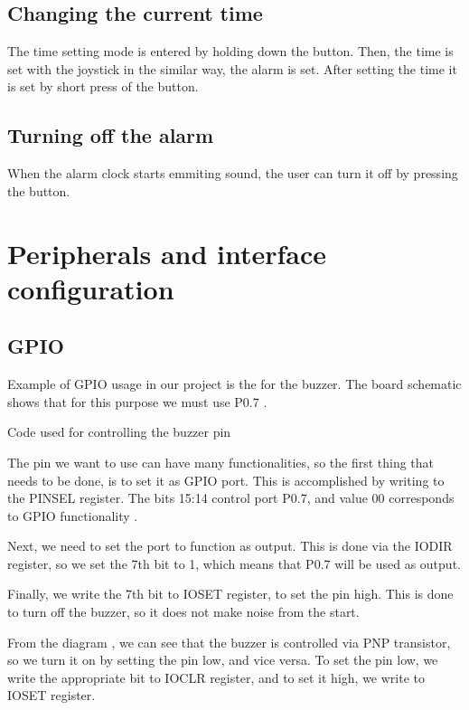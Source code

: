 \documentclass[10pt]{article}
\newcommand{\code}[3]{}
\begin{document}
    \subsection{Changing the current time}
    The time setting mode is entered by holding down the button.
    Then, the time is set with the joystick in the similar way, the alarm is set.
    After setting the time it is set by short press of the button.

    \subsection{Turning off the alarm}
    When the alarm clock starts emmiting sound, the user can turn it off by pressing the button.

    \section{Peripherals and interface configuration}
    
    \subsection{GPIO}
    Example of GPIO usage in our project is the for the buzzer. 
    The board schematic shows that for this purpose we must use P0.7 \mbox{\cite[p.9]{eduboard-man}}.

    \begin{program}
        \code{4}{21}{buzzer.h}
        \caption{Code used for controlling the buzzer pin}
    \end{program}

    The pin we want to use can have many functionalities, so the first thing that needs to be done, is to set it as GPIO port.
    This is accomplished by writing to the PINSEL register. The bits 15:14 control port P0.7, and value 00 corresponds to GPIO functionality \cite[p.59]{lpc2148-manual}.
    
    Next, we need to set the port to function as output. This is done via the IODIR register, so we set the 7th bit to 1, which means that P0.7 will be used as output.

    Finally, we write the 7th bit to IOSET register, to set the pin high. 
    This is done to turn off the buzzer, so it does not make noise from the start.

    From the diagram \cite[p.9]{eduboard-man}, we can see that the buzzer is controlled via PNP transistor, so we turn it on by setting the pin low, and vice versa.
    To set the pin low, we write the appropriate bit to IOCLR register, and to set it high, we write to IOSET register.
\end{document}
